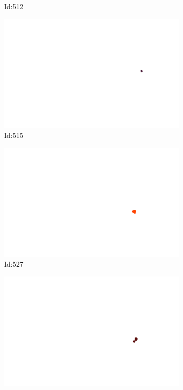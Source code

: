 \documentclass[12pt,twoside]{report}
\begin{document}
\begin{figure}
\begin{subfigure}[b]{0.20\textwidth}
\caption{Id:512}
\end{subfigure}
\begin{subfigure}[b]{0.20\textwidth}
\centering
\includegraphics[width=\textwidth]{../trajectories/515.png}
\caption{Id:515}
\end{subfigure}
\begin{subfigure}[b]{0.20\textwidth}
\centering
\includegraphics[width=\textwidth]{../trajectories/527.png}
\caption{Id:527}
\end{subfigure}
\begin{subfigure}[b]{0.20\textwidth}
\centering
\includegraphics[width=\textwidth]{../trajectories/533.png}

\end{subfigure}
\end{figure}
\end{document}
